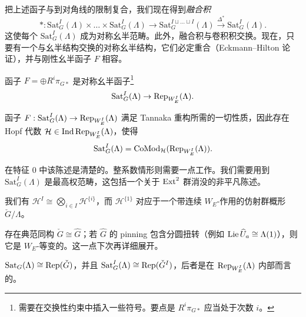 把上述函子与到对角线的限制复合，我们现在得到\emph{融合积}
\[
*:\mathrm{Sat}^I_G(\Lambda)\times\ldots\times\mathrm{Sat}^I_G(\Lambda)\to\mathrm{Sat}^{I\sqcup\ldots\sqcup I}_G(\Lambda)\xrightarrow{\Delta^*}\mathrm{Sat}^I_G(\Lambda).
\]
这使每个 $\mathrm{Sat}^I_G(\Lambda)$ 成为对称幺半范畴。此外，融合积与卷积积交换。现在，只要有一个与幺半结构交换的对称幺半结构，它们必定重合（Eckmann--Hilton 论证），并与刚性幺半函子 $F$ 相容。

\begin{proposition}
函子 $F=\oplus R^i\pi_{G*}$ 是对称幺半函子\footnote{需要在交换性约束中插入一些符号。要点是 $R^i\pi_{G*}$ 应当处于次数 $i$。}
\[
\mathrm{Sat}^I_G(\Lambda)\to\operatorname{Rep}_{W^I_E}(\Lambda).
\]
\end{proposition}

\begin{theorem}
函子 $F:\mathrm{Sat}^I_G(\Lambda)\to\operatorname{Rep}_{W^I_E}(\Lambda)$ 满足 Tannaka 重构所需的一切性质，因此存在 Hopf 代数 $\mathcal{H}\in\operatorname{Ind}\operatorname{Rep}_{W^I_E}(\Lambda)$，使得
\[
\mathrm{Sat}^I_G(\Lambda)=\mathrm{CoMod}_{\mathcal{H}}(\operatorname{Rep}_{W^I_E}(\Lambda)).
\]
\end{theorem}

在特征 $0$ 中该陈述是清楚的。整系数情形则需要一点工作。我们需要用到 $\mathrm{Sat}^I_G(\Lambda)$ 是最高权范畴，这包括一个关于 $\operatorname{Ext}^2$ 群消没的非平凡陈述。

\begin{proposition}
我们有 $\mathcal{H}^I\cong\bigotimes_{i\in I}\mathcal{H}^{\{i\}}$，而 $\mathcal{H}^{\{1\}}$ 对应于一个带连续 $W_E$-作用的仿射群概形 $\check G/\Lambda$。
\end{proposition}

\begin{theorem}
存在典范同构 $\check G\cong\widehat G$；若 $\widehat G$ 的 pinning 包含分圆扭转（例如 $\operatorname{Lie}\widehat U_a\cong\Lambda(1)$），则它是 $W_E$-等变的。这一点下次再详细展开。
\end{theorem}

\begin{corollary}
$\mathrm{Sat}_G(\Lambda)\cong\operatorname{Rep}(\check G)$，并且 $\mathrm{Sat}^I_G(\Lambda)\cong\operatorname{Rep}(\check G^I)$，后者是在 $\operatorname{Rep}_{W^I_E}(\Lambda)$ 内部而言的。
\end{corollary}
